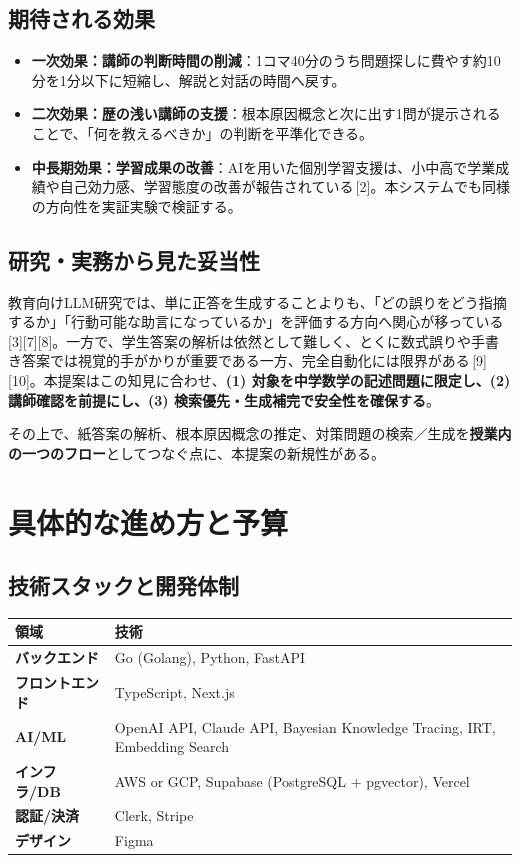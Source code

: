 \documentclass[paper=a4,fontsize=10.5bp,jafontsize=10.5bp,twocolumn]{jlreq}
\begin{document}
\subsection{期待される効果}

\begin{itemize}
  \item \textbf{一次効果：講師の判断時間の削減}：1コマ40分のうち問題探しに費やす約10分を1分以下に短縮し、解説と対話の時間へ戻す。
  \item \textbf{二次効果：歴の浅い講師の支援}：根本原因概念と次に出す1問が提示されることで、「何を教えるべきか」の判断を平準化できる。
  \item \textbf{中長期効果：学習成果の改善}：AIを用いた個別学習支援は、小中高で学業成績や自己効力感、学習態度の改善が報告されている\,[2]。本システムでも同様の方向性を実証実験で検証する。
\end{itemize}

\subsection{研究・実務から見た妥当性}

教育向けLLM研究では、単に正答を生成することよりも、「どの誤りをどう指摘するか」「行動可能な助言になっているか」を評価する方向へ関心が移っている\,[3][7][8]。一方で、学生答案の解析は依然として難しく、とくに数式誤りや手書き答案では視覚的手がかりが重要である一方、完全自動化には限界がある\,[9][10]。本提案はこの知見に合わせ、\textbf{(1) 対象を中学数学の記述問題に限定し、(2) 講師確認を前提にし、(3) 検索優先・生成補完で安全性を確保する}。

その上で、紙答案の解析、根本原因概念の推定、対策問題の検索／生成を\textbf{授業内の一つのフロー}としてつなぐ点に、本提案の新規性がある。

\section{具体的な進め方と予算}

\subsection{技術スタックと開発体制}

\begin{scriptsize}\noindent
\begin{tabularx}{\linewidth}{>{\bfseries}l X}
\toprule
領域 & 技術 \\
\midrule
バックエンド & Go (Golang), Python, FastAPI \\
フロントエンド & TypeScript, Next.js \\
AI/ML & OpenAI API, Claude API, Bayesian Knowledge Tracing, IRT, Embedding Search \\
インフラ/DB & AWS or GCP, Supabase (PostgreSQL + pgvector), Vercel \\
認証/決済 & Clerk, Stripe \\
デザイン & Figma \\
\bottomrule
\end{tabularx}
\end{scriptsize}
\end{document}
